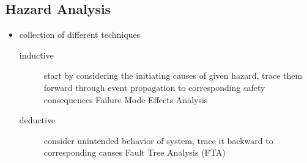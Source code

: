 \documentclass[a4paper, 10pt]{article}
\begin{document}
\subsection*{Hazard Analysis}
\begin{itemize}
    \item collection of different techniques
    \begin{description}
        \item[inductive] start by considering the initiating causes of given hazard, trace them forward through event propagation to corresponding safety consequences \follows Failure Mode Effects Analysis
        \item[deductive] consider unintended behavior of system, trace it backward to corresponding causes \follows Fault Tree Analysis (FTA)
    \end{description}
\end{itemize}
\end{document}
